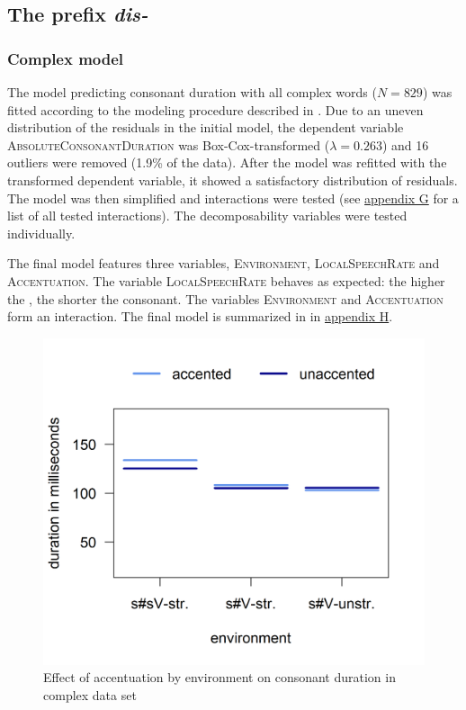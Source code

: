 \subsection{The prefix \textit{dis-} }


\subsubsection{Complex model}

The model predicting consonant duration with all complex words ($N=829$) was fitted according to the modeling procedure described in . Due to an uneven distribution of the residuals in the initial model, the dependent variable \textsc{AbsoluteConsonantDuration} was Box-Cox-transformed ($\lambda = 0.263$) and 16 outliers were removed (1.9\% of the data). After the model was refitted with the transformed dependent variable, it showed a satisfactory distribution of residuals. The model was then simplified and interactions were tested (see \hyperref[Appendix G Summaries of tested interactions in experimental study]{appendix G} for a list of all tested interactions). The decomposability variables were tested individually.

The final model features three variables, \textsc{Environment}, \textsc{LocalSpeechRate} and \textsc{Accentuation}. The variable \textsc{LocalSpeechRate} behaves as expected: the higher the , the shorter the consonant. The variables \textsc{Environment} and \textsc{Accentuation} form an interaction. The final model is summarized in  in \hyperref[Appendix H: Model Summaries Experiment]{appendix H}.






\begin{figure}
	
	\includegraphics [scale=0.5] {images/Experiment/DisModelInterEnvAcc}
	\caption{Effect of accentuation by environment on consonant duration in complex data set}
	\label{fig:NumNasal disComplex experiment}
\end{figure}



